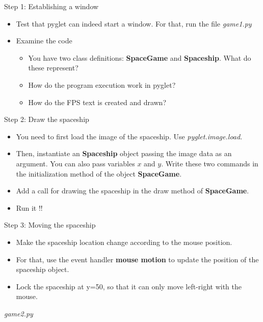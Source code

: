 \documentclass[10pt]{beamer}
\title
{}
\subtitle
{} %
\author %
{}
\institute[MKP] %
{}
\date
{\today}
\begin{document}
\begin{frame}
  \titlepage
\end{frame}



\begin{frame}{Step 1: Establishing a window}
\center

\begin{itemize}
\item Test that pyglet can indeed start a window. For that, run the file \textit{game1.py} 

\item Examine the code
\begin{itemize}

\item You have two class definitions: \textbf{SpaceGame} and \textbf{Spaceship}. What do these represent? 

\item How do the program execution work in pyglet?

\item How do the FPS text is created and drawn? 
\end{itemize}

\end{itemize}
\end{frame}

\begin{frame}{Step 2: Draw the spaceship}

\begin{itemize}

\item You need to first load the image of the spaceship. Use \textsl{pyglet.image.load}.
\item Then, instantiate an \textbf{Spaceship} object passing the image data as an argument. You can also pass variables $x$ and $y$.
Write these two commands in the initialization method of the object \textbf{SpaceGame}.
\item Add a call for drawing the spaceship in the draw method of \textbf{SpaceGame}.
\item Run it !!

\end{itemize}
\end{frame}

\begin{frame}{Step 3: Moving the spaceship}

\begin{itemize}
\item Make the spaceship location change according to the mouse position.
\item For that, use the event handler \textbf{mouse motion} to update the position of the spaceship object.

\item Lock the spaceship at y=50, so that it can only move left-right with the mouse.

\end{itemize}

\textit{game2.py}

\end{frame}
\end{document}
